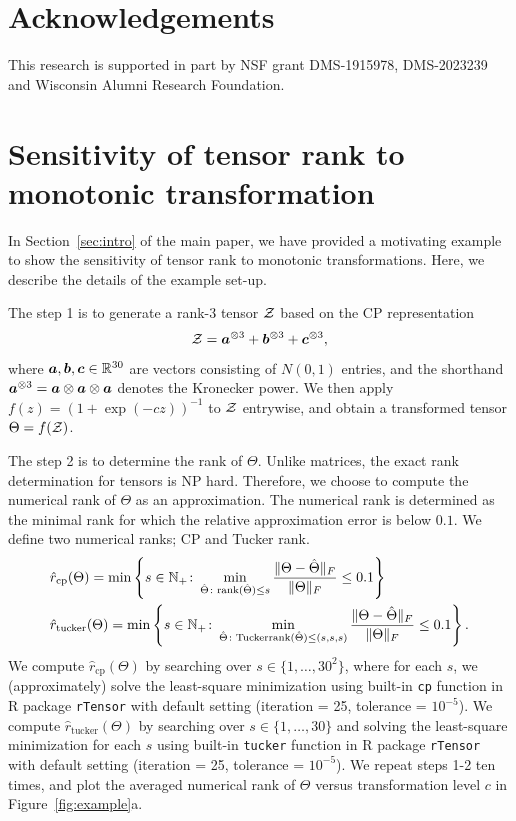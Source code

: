 \documentclass[twoside,11pt]{article}
\theoremstyle{plain}
\theoremstyle{definition}
\def\rank{\textup{rank}}
\begin{document}
\section*{Acknowledgements}
This research is supported in part by NSF grant DMS-1915978, DMS-2023239 and Wisconsin Alumni Research Foundation.



\appendix


\section{Sensitivity of tensor rank to monotonic transformation}\label{sec:numericalrank}
In Section~\ref{sec:intro} of the main paper, we have provided a motivating example to show the sensitivity of tensor rank to monotonic transformations. Here, we describe the details of the example set-up. 

The step 1 is to generate a rank-3 tensor $\mathcal{Z}$ based on the CP representation
\[
\mathcal{Z}=\bm{a}^{\otimes 3}+\bm{b}^{\otimes 3}+\bm{c}^{\otimes 3},
\]
where $\bm{a},\bm{b},\bm{c}\in\mathbb{R}^{30}$ are vectors consisting of $N(0,1)$ entries, and the shorthand $\bm{a}^{\otimes 3}=\bm{a}\otimes \bm{a}\otimes \bm{a}$ denotes the Kronecker power. We then apply $f(z)=(1+\exp(-cz))^{-1}$ to $\mathcal{Z}$ entrywise, and obtain a transformed tensor $\Theta=f(\mathcal{Z})$. 

The step 2 is to determine the rank of $\Theta$. Unlike matrices, the exact rank determination for tensors is NP hard. Therefore, we choose to compute the numerical rank of $\Theta$ as an approximation.  The numerical rank is determined as the minimal rank for which the relative approximation error is below $0.1$. We define two numerical ranks; CP and Tucker rank.
\begin{align}\label{eq:numeric}
& \hat r_{\text{cp}}(\Theta)=\min\left\{s\in\mathbb{N}_{+}\colon \min_{\hat \Theta\colon \rank(\hat \Theta)\leq s}{\FnormSize{}{\Theta-\hat \Theta}\over \FnormSize{}{\Theta}} \leq 0.1\right\}\\
& \hat r_{\text{tucker}}(\Theta)=\min\left\{s\in\mathbb{N}_{+}\colon \min_{\hat \Theta\colon \text{Tuckerrank}(\hat \Theta)\leq (s,s,s)}{\FnormSize{}{\Theta-\hat \Theta}\over \FnormSize{}{\Theta}} \leq 0.1\right\}.
\end{align}
We compute $\hat r_{\text{cp}}(\Theta)$ by searching over $s\in\{1,\ldots,30^2\}$, where for each $s$, we (approximately) solve the least-square minimization using built-in \texttt{cp} function in R package {\tt rTensor} with default setting (iteration = 25, tolerance = $10^{-5}$). 
We compute $\hat r_{\text{tucker}}(\Theta)$ by searching over $s\in\{1,\ldots,30\}$ and solving the least-square minimization for each $s$ using built-in \texttt{tucker} function in R package {\tt rTensor} with default setting (iteration = 25, tolerance = $10^{-5}$). 
We repeat steps 1-2 ten times, and plot the averaged numerical rank of $\Theta$ versus transformation level $c$ in Figure~\ref{fig:example}a.  
\end{document}
